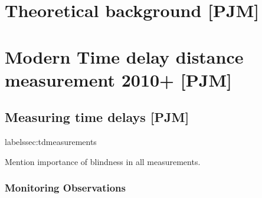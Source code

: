 








\section{Theoretical background [PJM]}
\label{sec:theory}




\section{Modern Time delay distance measurement 2010+ [PJM]}
\label{sec:timedelay}






\subsection{Measuring time delays [PJM]}
label{ssec:tdmeasurements}


Mention importance of blindness in all measurements.



\subsubsection{Monitoring Observations}

